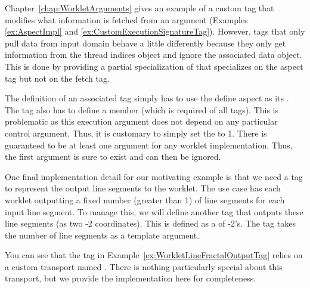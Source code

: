 Chapter~\ref{chap:WorkletArguments} gives an example of a custom \executionsignature tag that modifies what information is fetched from an argument (Examples \ref{ex:AspectImpl} and \ref{ex:CustomExecutionSignatureTag}).
However, \executionsignature tags that only pull data from input domain behave a little differently because they only get information from the thread indices object and ignore the associated data object.
This is done by providing a partial specialization of  that specializes on the aspect tag but not on the fetch tag.


The definition of an associated \executionsignature tag simply has to use the define aspect as its .
The tag also has to define a  member (which is required of all \executionsignature tags).
This is problematic as this execution argument does not depend on any particular control argument.
Thus, it is customary to simply set the  to 1.
There is guaranteed to be at least one \controlsignature argument for any worklet implementation.
Thus, the first argument is sure to exist and can then be ignored.


One final implementation detail for our motivating example is that we need a \controlsignature tag to represent the output line segments to the worklet.
The use case has each worklet outputting a fixed number (greater than 1) of line segments for each input line segment.
To manage this, we will define another \controlsignature tag that outputs these line segments (as two -2 coordinates).
This is defined as a  of -2's.
The tag takes the number of line segments as a template argument.


You can see that the tag in Example~\ref{ex:WorkletLineFractalOutputTag} relies on a custom transport named .
There is nothing particularly special about this transport, but we provide the implementation here for completeness.

